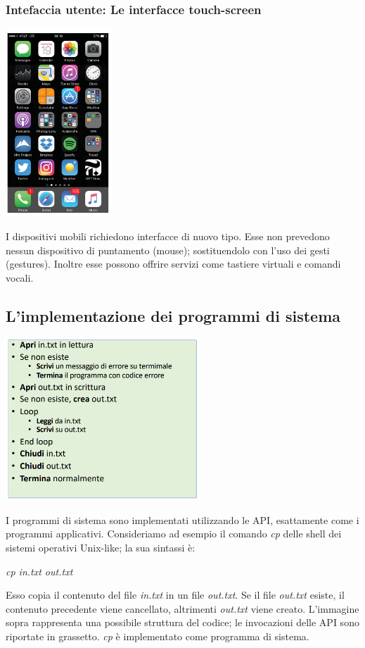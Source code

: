 \documentclass[12pt]{article}
\begin{document}
\subsubsection{Intefaccia utente: Le interfacce touch-screen}
\begin{center}
    \includegraphics[width = 0.30\textwidth]{Images/8.PNG}
\end{center}
I dispositivi mobili richiedono interfacce di nuovo tipo. Esse non prevedono nessun dispositivo di puntamento (mouse); sostituendolo con l'uso dei gesti (gestures).
Inoltre esse possono offrire servizi come tastiere virtuali e comandi vocali.
\subsection{L'implementazione dei programmi di sistema}
\begin{center}
    \includegraphics[width = 0.55\textwidth]{Images/9.PNG}
\end{center}
I programmi di sistema sono implementati utilizzando le API, esattamente come i programmi applicativi.
Consideriamo ad esempio il comando \textit{cp} delle shell dei sistemi operativi Unix-like; la sua sintassi è:
\begin{center}
    \textit{cp in.txt out.txt}
\end{center}
Esso copia il contenuto del file \textit{in.txt} in un file \textit{out.txt}. Se il file \textit{out.txt} esiste, il contenuto precedente viene cancellato, altrimenti \textit{out.txt} viene creato.
L'immagine sopra rappresenta una possibile struttura del codice; le invocazioni delle API sono riportate in grassetto.
\textit{cp} è implementato come programma di sistema.
\end{document}
